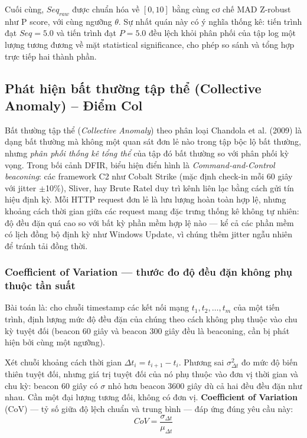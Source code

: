 \documentclass[../main.tex]{subfiles}
\begin{document}
Cuối cùng, $Seq_{raw}$ được chuẩn hóa về $[0, 10]$ bằng cùng cơ chế MAD Z-robust như P score, với cùng ngưỡng $\theta$. Sự nhất quán này có ý nghĩa thống kê: tiến trình đạt $Seq = 5.0$ và tiến trình đạt $P = 5.0$ đều lệch khỏi phân phối của tập log một lượng tương đương về mặt statistical significance, cho phép so sánh và tổng hợp trực tiếp hai thành phần.

\subsection{Phát hiện bất thường tập thể (Collective Anomaly) – Điểm Col}
\label{subsection:2.4.5}

Bất thường tập thể (\textit{Collective Anomaly}) theo phân loại Chandola et al. (2009) là dạng bất thường mà không một quan sát đơn lẻ nào trong tập bộc lộ bất thường, nhưng \textit{phân phối thống kê tổng thể} của tập đó bất thường so với phân phối kỳ vọng. Trong bối cảnh DFIR, biểu hiện điển hình là \textit{Command-and-Control beaconing}: các framework C2 như Cobalt Strike (mặc định check-in mỗi 60 giây với jitter $\pm$10\%), Sliver, hay Brute Ratel duy trì kênh liên lạc bằng cách gửi tín hiệu định kỳ. Mỗi HTTP request đơn lẻ là lưu lượng hoàn toàn hợp lệ, nhưng khoảng cách thời gian giữa các request mang đặc trưng thống kê không tự nhiên: độ đều đặn quá cao so với bất kỳ phần mềm hợp lệ nào — kể cả các phần mềm có lịch đồng bộ định kỳ như Windows Update, vì chúng thêm jitter ngẫu nhiên để tránh tải đồng thời.

\subsubsection{Coefficient of Variation — thước đo độ đều đặn không phụ thuộc tần suất}
\label{subsubsection:2.4.5.1}

Bài toán là: cho chuỗi timestamp các kết nối mạng $t_1, t_2, \ldots, t_m$ của một tiến trình, định lượng mức độ đều đặn của chúng theo cách không phụ thuộc vào chu kỳ tuyệt đối (beacon 60 giây và beacon 300 giây đều là beaconing, cần bị phát hiện bởi cùng một ngưỡng).

Xét chuỗi khoảng cách thời gian $\Delta t_i = t_{i+1} - t_i$. Phương sai $\sigma_{\Delta t}^2$ đo mức độ biến thiên tuyệt đối, nhưng giá trị tuyệt đối của nó phụ thuộc vào đơn vị thời gian và chu kỳ: beacon 60 giây có $\sigma$ nhỏ hơn beacon 3600 giây dù cả hai đều đều đặn như nhau. Cần một đại lượng tương đối, không có đơn vị. \textbf{Coefficient of Variation} (CoV) — tỷ số giữa độ lệch chuẩn và trung bình — đáp ứng đúng yêu cầu này:
\begin{equation}
    CoV = \frac{\sigma_{\Delta t}}{\mu_{\Delta t}} \tag{1.21}
\end{equation}
\end{document}
